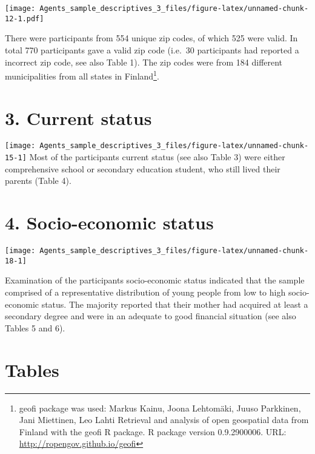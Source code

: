 \documentclass[
]{article}
\begin{document}
\texttt{[image: Agents\_sample\_descriptives\_3\_files/figure-latex/unnamed-chunk-12-1.pdf]}

There were participants from 554 unique zip codes, of which 525 were
valid. In total 770 participants gave a valid zip code (i.e.~30
participants had reported a incorrect zip code, see also Table 1). The
zip codes were from 184 different municipalities from all states in
Finland\footnote{geofi package was used: Markus Kainu, Joona Lehtomäki,
  Juuso Parkkinen, Jani Miettinen, Leo Lahti Retrieval and analysis of
  open geospatial data from Finland with the geofi R package. R package
  version 0.9.2900006. URL: \url{http://ropengov.github.io/geofi}}.

\newpage

\hypertarget{current-status}{%
\section{3. Current status}\label{current-status}}

\texttt{[image: Agents\_sample\_descriptives\_3\_files/figure-latex/unnamed-chunk-15-1]}
Most of the participants current status (see also Table 3) were either
comprehensive school or secondary education student, who still lived
their parents (Table 4).

\newpage

\hypertarget{socio-economic-status}{%
\section{4. Socio-economic status}\label{socio-economic-status}}

\texttt{[image: Agents\_sample\_descriptives\_3\_files/figure-latex/unnamed-chunk-18-1]}

Examination of the participants socio-economic status indicated that the
sample comprised of a representative distribution of young people from
low to high socio-economic status. The majority reported that their
mother had acquired at least a secondary degree and were in an adequate
to good financial situation (see also Tables 5 and 6).

\newpage

\hypertarget{tables}{%
\section{Tables}\label{tables}}
\end{document}
